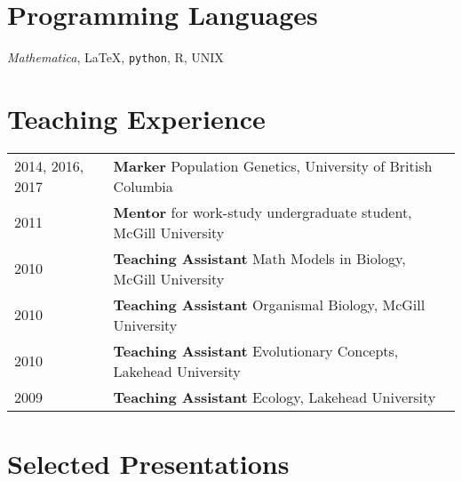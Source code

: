 \documentclass[12pt]{article}
\begin{document}
\section*{Programming Languages}
\noindent \textit{Mathematica}, \LaTeX, \texttt{python}, \textsf{R}, UNIX 

\section*{Teaching Experience}

\begin{tabular}{ll}
2014, 2016, 2017 & \textbf{Marker} Population Genetics, University of British Columbia \\
2011 & \textbf{Mentor} for work-study undergraduate student, McGill University \\
2010 & \textbf{Teaching Assistant} Math Models in Biology, McGill University \\
2010 & \textbf{Teaching Assistant} Organismal Biology, McGill University\\
2010 &  \textbf{Teaching Assistant} Evolutionary Concepts, Lakehead University\\
2009 &  \textbf{Teaching Assistant} Ecology, Lakehead University
\end{tabular}

%

\section*{Selected Presentations}

\end{document}
